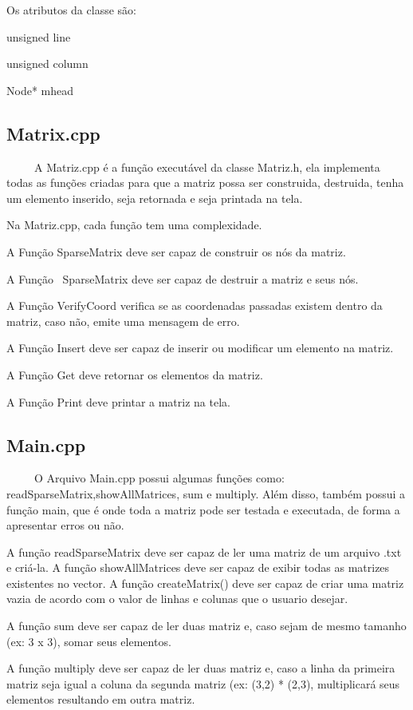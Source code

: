 \documentclass{article}
\begin{document}
Os atributos da classe são:

unsigned {line}

unsigned {column}

Node* {mhead}

\subsection{Matrix.cpp}

~~~~~A Matriz.cpp é a função executável da classe Matriz.h, ela implementa todas as funções criadas para que a matriz possa ser construida, destruida, tenha um elemento inserido, seja retornada e seja printada na tela.

Na Matriz.cpp, cada função tem uma complexidade.

A Função SparseMatrix deve ser capaz de construir os nós da matriz.

A Função ~SparseMatrix deve ser capaz de destruir a matriz e seus nós. 

A Função VerifyCoord verifica se as coordenadas passadas existem dentro da matriz, caso não, emite uma mensagem de erro.

A Função Insert deve ser capaz de inserir ou modificar um elemento na matriz.

A Função Get deve retornar os elementos da matriz.

A Função Print deve printar a matriz na tela.

\subsection{Main.cpp}

~~~~~O Arquivo Main.cpp possui algumas funções como: readSparseMatrix,showAllMatrices, sum e multiply. Além disso, também possui a função main, que é onde toda a matriz pode ser testada e executada, de forma a apresentar erros ou não.

A função readSparseMatrix deve ser capaz de ler uma matriz de um arquivo .txt e criá-la.
A função showAllMatrices deve ser capaz de exibir todas as matrizes existentes no vector.
A função createMatrix() deve ser capaz de criar uma matriz vazia de acordo com o valor de linhas e colunas que o usuario desejar.

A função sum deve ser capaz de ler duas matriz e, caso sejam de mesmo tamanho (ex: 3 x 3), somar seus elementos.

A função multiply deve ser capaz de ler duas matriz e, caso a linha da primeira matriz seja igual a coluna da segunda matriz (ex: (3,2) * (2,3), multiplicará seus elementos resultando em outra matriz.
\end{document}
